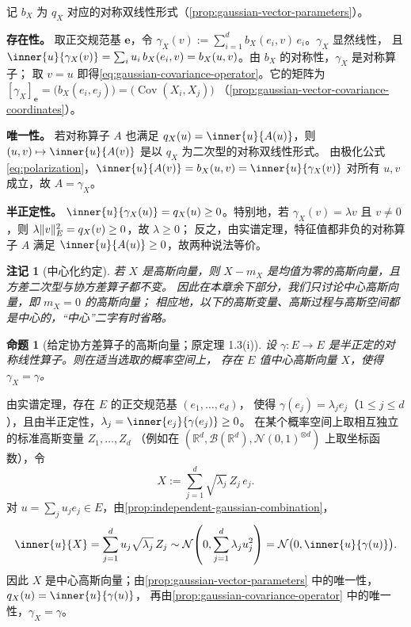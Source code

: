 \documentclass[UTF8,11pt,a4paper,oneside,fontset=fandol]{ctexrep}
\makeatletter
\numberwithin{equation}{section}
\theoremstyle{zhthm}
\newtheorem{proposition}[theorem]{命题}
\newtheorem{remark}[theorem]{注记}
\renewenvironment{proof}[1][\proofname]{\par
  \pushQED{\qed}%
  \normalfont\topsep6\p@\@plus6\p@\relax
  \trivlist
  \item[\hskip\labelsep\bfseries#1\hspace{0.5em}]\ignorespaces
}{%
  \popQED\endtrivlist\@endpefalse
}
\renewcommand{\proofname}{证明}
\newcommand{\R}{\mathbb{R}}
\newcommand{\B}{\mathcal{B}}
\DeclareMathOperator{\Cov}{Cov}
\newcommand{\Normal}{\mathcal{N}}
\DeclarePairedDelimiter{\norm}{\lVert}{\rVert}
\makeatother
\begin{document}
\begin{proof}
记 $b_X$ 为 $q_X$ 对应的对称双线性形式（\cref{prop:gaussian-vector-parameters}）。

\textbf{存在性。}
取正交规范基 $\mathbf e$，令 $\gamma_X(v):=\sum_{i=1}^{d}b_X(e_i,v)\,e_i$。$\gamma_X$ 显然线性，
且 $\inner{u}{\gamma_X(v)}=\sum_iu_i\,b_X(e_i,v)=b_X(u,v)$。由 $b_X$ 的对称性，$\gamma_X$ 是对称算子；
取 $v=u$ 即得\cref{eq:gaussian-covariance-operator}。它的矩阵为
$[\gamma_X]_{\mathbf e}=\bigl(b_X(e_i,e_j)\bigr)=\bigl(\Cov(X_i,X_j)\bigr)$
（\cref{prop:gaussian-vector-covariance-coordinates}）。

\textbf{唯一性。}
若对称算子 $A$ 也满足 $q_X(u)=\inner{u}{A(u)}$，则 $(u,v)\mapsto\inner{u}{A(v)}$ 是以 $q_X$ 为二次型的对称双线性形式。
由极化公式\cref{eq:polarization}，$\inner{u}{A(v)}=b_X(u,v)=\inner{u}{\gamma_X(v)}$ 对所有 $u,v$ 成立，故 $A=\gamma_X$。

\textbf{半正定性。}
$\inner{u}{\gamma_X(u)}=q_X(u)\ge0$。特别地，若 $\gamma_X(v)=\lambda v$ 且 $v\ne0$，则 $\lambda\norm{v}_E^2=q_X(v)\ge0$，故 $\lambda\ge0$；
反之，由实谱定理，特征值都非负的对称算子 $A$ 满足 $\inner{u}{A(u)}\ge0$，故两种说法等价。
\end{proof}

\begin{remark}[中心化约定]
\label{rem:centered-gaussian-convention}
若 $X$ 是高斯向量，则 $X-m_X$ 是均值为零的高斯向量，且方差二次型与协方差算子都不变。
因此在本章余下部分，我们只讨论中心高斯向量，即 $m_X=0$ 的高斯向量；
相应地，以下的高斯变量、高斯过程与高斯空间都是中心的，“中心”二字有时省略。
\end{remark}

\begin{proposition}[给定协方差算子的高斯向量；原定理 1.3(i)]
\label{prop:gaussian-covariance-existence}
设 $\gamma:E\to E$ 是半正定的对称线性算子。则在适当选取的概率空间上，
存在 $E$ 值中心高斯向量 $X$，使得 $\gamma_X=\gamma$。
\end{proposition}

\begin{proof}
由实谱定理\cite[定理 7.29，第 245 页]{Axler2024}，存在 $E$ 的正交规范基 $(e_1,\ldots,e_d)$，
使得 $\gamma(e_j)=\lambda_je_j$（$1\le j\le d$），且由半正定性，$\lambda_j=\inner{e_j}{\gamma(e_j)}\ge0$。
在某个概率空间上取相互独立的标准高斯变量 $Z_1,\ldots,Z_d$
（例如在 $(\R^d,\B(\R^d),\Normal(0,1)^{\otimes d})$ 上取坐标函数），令
\[
  X:=\sum_{j=1}^{d}\sqrt{\lambda_j}\,Z_j\,e_j.
\]
对 $u=\sum_ju_je_j\in E$，由\cref{prop:independent-gaussian-combination}，
\[
  \inner{u}{X}=\sum_{j=1}^{d}u_j\sqrt{\lambda_j}\,Z_j
  \sim\Normal\!\left(0,\sum_{j=1}^{d}\lambda_ju_j^2\right)
  =\Normal\bigl(0,\inner{u}{\gamma(u)}\bigr).
\]
因此 $X$ 是中心高斯向量；由\cref{prop:gaussian-vector-parameters} 中的唯一性，$q_X(u)=\inner{u}{\gamma(u)}$，
再由\cref{prop:gaussian-covariance-operator} 中的唯一性，$\gamma_X=\gamma$。
\end{proof}
\end{document}
